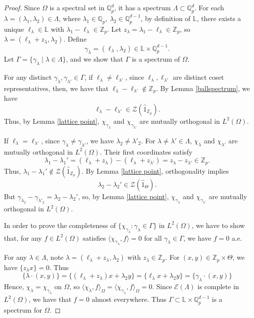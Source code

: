 \documentclass[a4paper,12pt]{amsart}
\def\Zp{\mathbb{Z}_p}
\def\Qp{\mathbb{Q}_p}
\begin{document}
\begin{proof}

Since $\Omega$ is a spectral set in $ \Qp^d$, it has a spectrum $\Lambda \subset \Qp^d$.
For each $\lambda = (\lambda_1, \lambda_2) \in \Lambda$, where $\lambda_1\in \Qp, \ \lambda_2\in\Qp^{d-1}$,
by definition of $\mathbb{L}$, there exists a unique $\ell_\lambda \in \mathbb{L}$ with $\lambda_1 - \ell_\lambda \in \Zp$.
Let $z_\lambda = \lambda_1 - \ell_\lambda \in \Zp$, so $\lambda = (\ell_\lambda + z_\lambda, \lambda_2)$.
Define $$\gamma_\lambda = (\ell_\lambda, \lambda_2) \in \mathbb{L} \times \Qp^{d-1}.$$
Let $\Gamma = \{\gamma_\lambda \mid \lambda \in \Lambda\}$, and we show that $\Gamma$ is a spectrum of $\Omega$.

 For any distinct $\gamma_\lambda, \gamma_{\lambda'} \in \Gamma$,
if $\ell_\lambda \neq \ell_{\lambda'}$,
since $\ell_\lambda, \ell_{\lambda'}$ are distinct coset representatives, then, we have that  $\ell_\lambda - \ell_{\lambda'} \notin \Zp$. By Lemma \ref{ballspectrum}, we have
\[
 \ell_\lambda - \ell_{\lambda'} \in \mathcal{Z}(\widehat{1}_{\Zp}).
\]
Thus, by Lemma \ref{lattice point}, $\chi_{\gamma_\lambda}$ and $ \chi_{\gamma_{\lambda'}}$ are mutually orthogonal in $L^2(\Omega)$.

If $\ell_\lambda = \ell_{\lambda'}$,
since $\gamma_\lambda \neq \gamma_{\lambda'}$, we have $\lambda_2 \neq \lambda'_2$. For $\lambda \neq\lambda' \in \Lambda$,
$\chi_\lambda$ and $\chi_{\lambda'}$ are mutually orthogonal in $L^2(\Omega)$. Their first coordinates satisfy
\[
\lambda_1 - \lambda_1' = (\ell_\lambda + z_\lambda) - (\ell_\lambda + z_{\lambda'}) = z_\lambda - z_{\lambda'} \in \Zp.
\]
Thus, $\lambda_1 - \lambda_1' \notin \mathcal{Z}(\widehat{1}_{\Zp})$. By Lemma \ref{lattice point}, orthogonality implies
\[
\lambda_2 - \lambda_2' \in \mathcal{Z}(\widehat{1}_{\Theta}).
\]
But $\gamma_{\lambda_2} - \gamma_{\lambda'_2} = \lambda_2 - \lambda_2'$, so, by Lemma \ref{lattice point},
 $\chi_{\gamma_\lambda}$ and $\chi_{\gamma_{\lambda'}}$ are mutually orthogonal in $L^2(\Omega)$.

In order to prove the completeness of $\{\chi_{\gamma_\lambda}: \gamma_\lambda\in \Gamma\}$ in $L^2(\Omega)$,
we have to show that, for any $f \in L^2(\Omega)$ satisfies $\langle \chi_{\gamma_\lambda}, f \rangle = 0$
for all $\gamma_\lambda \in \Gamma$, we have  $f = 0$ a.e.

For any $\lambda \in \Lambda$, note $\lambda = (\ell_\lambda + z_\lambda, \lambda_2)$ with $z_\lambda \in \Zp$. For $(x, y) \in \Zp \times \Theta$, we have $\{{z_\lambda x}\} = 0$.
Thus
\[
\{{\lambda \cdot (x, y)}\} = \{{(\ell_\lambda + z_\lambda)x + \lambda_2 y}\} = \{{\ell_\lambda x + \lambda_2 y}\} = \{{\gamma_\lambda \cdot (x, y)}\}
\]
Hence, $\chi_\lambda = \chi_{\gamma_\lambda}$ on $\Omega$, so $\langle \chi_\lambda, f \rangle_\Omega
= \langle \chi_{\gamma_\lambda}, f\rangle_\Omega=0$.
Since $\mathcal{E}(\Lambda)$ is complete in $L^2(\Omega)$, we have that $f=0$ almost everywhere.
Thus $\Gamma \subset \mathbb{L} \times \Qp^{d-1}$ is a spectrum for $\Omega$.
\end{proof}
\end{document}
